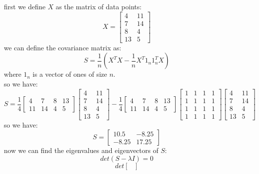 \begin{qsolve}
    \begin{qsolve}[]
        first we define $X$ as the matrix of data points:
        $$X = \begin{bmatrix}
            4 & 11\\
            7 & 14\\
            8 & 4\\
            13 & 5
            \end{bmatrix}$$
        we can define the covariance matrix as:
        $$S = \frac{1}{n}(X^TX- \frac{1}{n}X^T1_n1_n^TX)$$
        where $1_n$ is a vector of ones of size $n$.\\
        \splitqsolve[\splitqsolve]
        so we have:
        $$S = \frac{1}{4}\begin{bmatrix}
            4 & 7 & 8 & 13\\
            11 & 14 & 4 & 5
            \end{bmatrix}\begin{bmatrix}
            4 & 11\\
            7 & 14\\
            8 & 4\\
            13 & 5
            \end{bmatrix} - \frac{1}{4}\begin{bmatrix}
            4 & 7 & 8 & 13\\
            11 & 14 & 4 & 5
            \end{bmatrix}\begin{bmatrix}
            1 & 1 & 1 & 1\\
            1 & 1 & 1 & 1\\
            1 & 1 & 1 & 1\\
            1 & 1 & 1 & 1
            \end{bmatrix}\begin{bmatrix}
            4 & 11\\
            7 & 14\\
            8 & 4\\
            13 & 5
            \end{bmatrix}$$
        so we have:
        $$S = \begin{bmatrix}
            10.5 & -8.25\\
            -8.25 & 17.25
        \end{bmatrix}$$
        now we can find the eigenvalues and eigenvectors of $S$:
        $$det(S-\lambda I) = 0$$
        $$det\begin{bmatrix}

\end{bmatrix}$$
\end{qsolve}
\end{qsolve}
